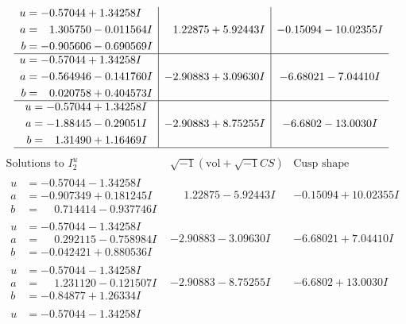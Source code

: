 \documentclass[1p]{elsarticle_modified}
\theoremstyle{definition}
\newcommand{\I}{\sqrt{-1}}
\begin{document}
$$\begin{array}{c|c|c}
\begin{aligned}
u &= -0.57044 + 1.34258 I \\
a &= \phantom{-}1.305750 - 0.011564 I \\
b &= -0.905606 - 0.690569 I\end{aligned}
 & \phantom{-}1.22875 + 5.92443 I & -0.15094 - 10.02355 I \\ \hline\begin{aligned}
u &= -0.57044 + 1.34258 I \\
a &= -0.564946 - 0.141760 I \\
b &= \phantom{-}0.020758 + 0.404573 I\end{aligned}
 & -2.90883 + 3.09630 I & -6.68021 - 7.04410 I \\ \hline\begin{aligned}
u &= -0.57044 + 1.34258 I \\
a &= -1.88445 - 0.29051 I \\
b &= \phantom{-}1.31490 + 1.16469 I\end{aligned}
 & -2.90883 + 8.75255 I & -6.6802 - 13.0030 I\\
 \hline 
 \end{array}$$\newpage$$\begin{array}{c|c|c}  
\text{Solutions to }I^u_{2}& \I (\text{vol} + \sqrt{-1}CS) & \text{Cusp shape}\\
 \hline 
\begin{aligned}
u &= -0.57044 - 1.34258 I \\
a &= -0.907349 + 0.181245 I \\
b &= \phantom{-}0.714414 - 0.937746 I\end{aligned}
 & \phantom{-}1.22875 - 5.92443 I & -0.15094 + 10.02355 I \\ \hline\begin{aligned}
u &= -0.57044 - 1.34258 I \\
a &= \phantom{-}0.292115 - 0.758984 I \\
b &= -0.042421 + 0.880536 I\end{aligned}
 & -2.90883 - 3.09630 I & -6.68021 + 7.04410 I \\ \hline\begin{aligned}
u &= -0.57044 - 1.34258 I \\
a &= \phantom{-}1.231120 - 0.121507 I \\
b &= -0.84877 + 1.26334 I\end{aligned}
 & -2.90883 - 8.75255 I & -6.6802 + 13.0030 I \\ \hline\begin{aligned}
u &= -0.57044 - 1.34258 I \\

\end{aligned}
\end{array}$$
\end{document}
